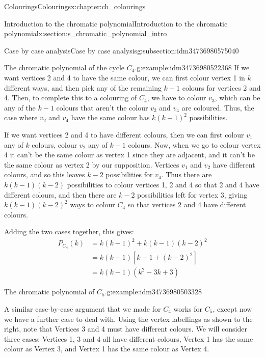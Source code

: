 \documentclass[oneside,10pt,]{book}
\numberwithin{equation}{section}
\newcommand{\amp}{&}
\begin{document}
\begin{chapterptx}{Colourings}{}{Colourings}{}{}{x:chapter:ch_colourings}
\begin{sectionptx}{Introduction to the chromatic polynomial}{}{Introduction to the chromatic polynomial}{}{}{x:section:s_chromatic_polynomial_intro}
\begin{subsectionptx}{Case by case analysis}{}{Case by case analysis}{}{}{g:subsection:idm34736980575040}
\begin{example}{The chromatic polynomial of the cycle \(C_4\).}{g:example:idm34736980522368}
If we want vertices 2 and 4 to have the same colour, we can first colour vertex 1 in \(k\) different ways, and then pick any of the remaining \(k-1\) colours for vertices 2 and 4.  Then, to complete this to a colouring of \(C_4\), we have to colour \(v_3\), which can be any of the \(k-1\) colours that aren't the colour \(v_2\) and \(v_4\) are coloured.  Thus, the case where \(v_2\) and \(v_4\) have the same colour has \(k(k-1)^2\) possibilities.%
\par
If we want vertices 2 and 4 to have different colours, then we can first colour \(v_1\) any of \(k\) colours, colour \(v_2\) any of \(k-1\) colours.  Now, when we go to colour vertex 4 it can't be the same colour as vertex 1 since they are adjacent, and it can't be the same colour as vertex 2 by our supposition.  Vertices \(v_1\) and \(v_2\) have different colours, and so this leaves \(k-2\) possibilities for \(v_4\).  Thus there are \(k(k-1)(k-2)\) possibilities to colour vertices 1, 2 and 4 so that 2 and 4 have different colours, and then there are \(k-2\) possibilities left for vertex 3, giving \(k(k-1)(k-2)^2\) ways to colour \(C_4\) so that vertices 2 and 4 have different colours.%
\par
Adding the two cases together, this gives:%
%
\begin{align*}
P_{C_4}(k)\amp=k(k-1)^2+k(k-1)(k-2)^2\\
\amp=k(k-1)[k-1+(k-2)^2]\\
\amp=k(k-1)(k^2-3k+3)
\end{align*}
\end{example}
\begin{example}{The chromatic polynomial of \(C_5\).}{g:example:idm34736980503328}%
\begin{sidebyside}{2}{0.025}{0.025}{0.05}%
\begin{sbspanel}{0.6}%
A similar case-by-case argument that we made for \(C_4\) works for \(C_5\), except now we have a further case to deal with.  Using the vertex labellings as shown to the right, note that Vertices 3 and 4 must have different colours.  We will consider three cases: Vertices 1, 3 and 4 all have different colours, Vertex 1 has the same colour as Vertex 3, and Vertex 1 has the same colour as Vertex 4.%
\end{sbspanel}%
\begin{sbspanel}{0.3}%
\end{sbspanel}
\end{sidebyside}
\end{example}
\end{subsectionptx}
\end{sectionptx}
\end{chapterptx}
\end{document}
